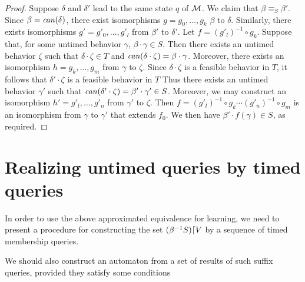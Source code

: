 \begin{proof}
Suppose $\delta$ and $\delta'$ lead to the same state $q$ of ${\mathcal M}$.
We claim that $\beta \equiv_S \beta'$.
Since $\beta = \mathit{can}({\delta})$, there exist isomorphisms
$g = g_0 ,\ldots, g_k$  $\beta$ to $\delta$.
Similarly, there exists isomorphisms $g' = g'_0 ,\ldots, g'_l$ from
$\beta'$ to $\delta'$.
Let $f = (g'_l)^{-1} \circ g_k$.
Suppose that, for some untimed behavior $\gamma$, $\beta \cdot \gamma \in S$.
Then there exists an untimed behavior $\zeta$ such that $\delta \cdot \zeta \in T$ and $\mathit{can}({\delta \cdot \zeta}) = \beta \cdot \gamma$.
Moreover, there exists an isomorphism $h = g_k ,\ldots, g_m$ from $\gamma$ to $\zeta$.
Since $\delta \cdot \zeta$ is a feasible behavior in $T$, it follows that
$\delta' \cdot \zeta$ is a feasible behavior in $T$
Thus there exists an untimed behavior $\gamma'$ such that $\mathit{can}({\delta' \cdot \zeta}) = \beta' \cdot \gamma' \in S$.
Moreover, we may construct an isomorphism $h' = g'_l ,\ldots, g'_n$ from $\gamma'$ to $\zeta$.
Then $f = (g'_l)^{-1} \circ g_k \cdots (g'_n)^{-1} \circ g_m$ is an isomorphism from $\gamma$ to $\gamma'$ that extends $f_0$.
We then have $\beta' \cdot f(\gamma) \in S$, as required.
\end{proof}


\section{Realizing untimed queries by timed queries}

In order to use the above approximated equivalence for learning, we need to
present a procedure for constructing the set
$({\beta}^{-1}{S})\lceil{V}$ by a sequence of timed membership queries.

We should also construct an automaton from a set of results of such
suffix queries, provided they satisfy some conditions


